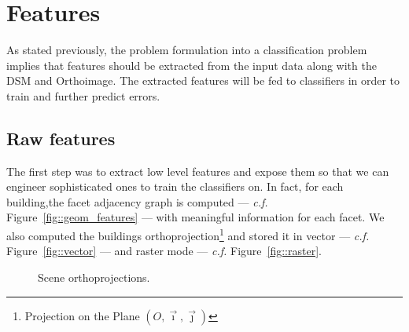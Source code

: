 \documentclass[../main.tex]{subfiles}
\begin{document}
	\section{Features}

	As stated previously, the problem formulation into a classification problem implies that features should be extracted from the input data along with the DSM and Orthoimage. The extracted features will be fed to classifiers in order to train and further predict errors.\\

	\subsection{Raw features}


	The first step was to extract low level features and expose them so that we can engineer sophisticated ones to train the classifiers on. In fact, for each building,the facet adjacency graph is computed --- \textit{c.f.} Figure~\ref{fig::geom_features} --- with meaningful information for each facet. We also computed the buildings orthoprojection\footnote{Projection on the Plane $(O, \vec{\imath}, \vec{\jmath})$} and stored it in vector --- \textit{c.f.} Figure~\ref{fig::vector} --- and raster mode --- \textit{c.f.} Figure~\ref{fig::raster}.\\

	\begin{figure}[H]
		{
			\caption{\label{fig::orthoproj}Scene orthoprojections.}
		}
	\end{figure}
\end{document}
